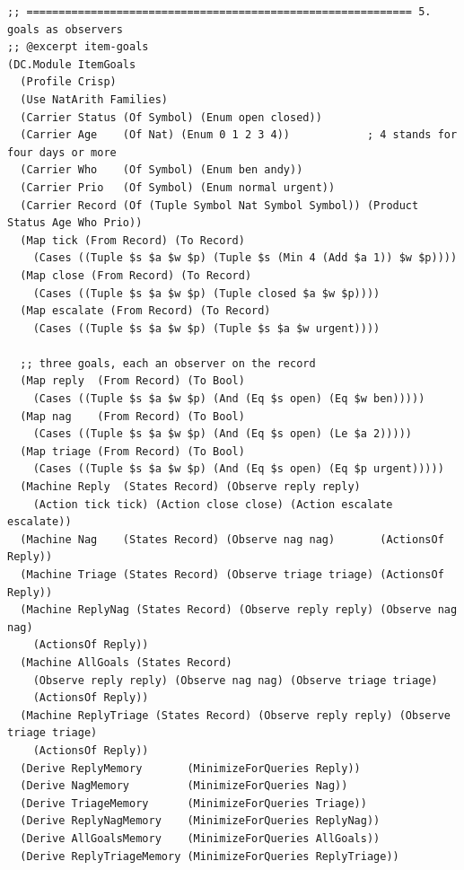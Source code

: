 \documentclass[11pt]{article}
\theoremstyle{definition}
\theoremstyle{plain}
\begin{document}
\begin{lstlisting}[style=mettafull]
;; ============================================================ 5. goals as observers
;; @excerpt item-goals
(DC.Module ItemGoals
  (Profile Crisp)
  (Use NatArith Families)
  (Carrier Status (Of Symbol) (Enum open closed))
  (Carrier Age    (Of Nat) (Enum 0 1 2 3 4))            ; 4 stands for four days or more
  (Carrier Who    (Of Symbol) (Enum ben andy))
  (Carrier Prio   (Of Symbol) (Enum normal urgent))
  (Carrier Record (Of (Tuple Symbol Nat Symbol Symbol)) (Product Status Age Who Prio))
  (Map tick (From Record) (To Record)
    (Cases ((Tuple $s $a $w $p) (Tuple $s (Min 4 (Add $a 1)) $w $p))))
  (Map close (From Record) (To Record)
    (Cases ((Tuple $s $a $w $p) (Tuple closed $a $w $p))))
  (Map escalate (From Record) (To Record)
    (Cases ((Tuple $s $a $w $p) (Tuple $s $a $w urgent))))

  ;; three goals, each an observer on the record
  (Map reply  (From Record) (To Bool)
    (Cases ((Tuple $s $a $w $p) (And (Eq $s open) (Eq $w ben)))))
  (Map nag    (From Record) (To Bool)
    (Cases ((Tuple $s $a $w $p) (And (Eq $s open) (Le $a 2)))))
  (Map triage (From Record) (To Bool)
    (Cases ((Tuple $s $a $w $p) (And (Eq $s open) (Eq $p urgent)))))
  (Machine Reply  (States Record) (Observe reply reply)
    (Action tick tick) (Action close close) (Action escalate escalate))
  (Machine Nag    (States Record) (Observe nag nag)       (ActionsOf Reply))
  (Machine Triage (States Record) (Observe triage triage) (ActionsOf Reply))
  (Machine ReplyNag (States Record) (Observe reply reply) (Observe nag nag)
    (ActionsOf Reply))
  (Machine AllGoals (States Record)
    (Observe reply reply) (Observe nag nag) (Observe triage triage)
    (ActionsOf Reply))
  (Machine ReplyTriage (States Record) (Observe reply reply) (Observe triage triage)
    (ActionsOf Reply))
  (Derive ReplyMemory       (MinimizeForQueries Reply))
  (Derive NagMemory         (MinimizeForQueries Nag))
  (Derive TriageMemory      (MinimizeForQueries Triage))
  (Derive ReplyNagMemory    (MinimizeForQueries ReplyNag))
  (Derive AllGoalsMemory    (MinimizeForQueries AllGoals))
  (Derive ReplyTriageMemory (MinimizeForQueries ReplyTriage))


\end{lstlisting}
\end{document}

